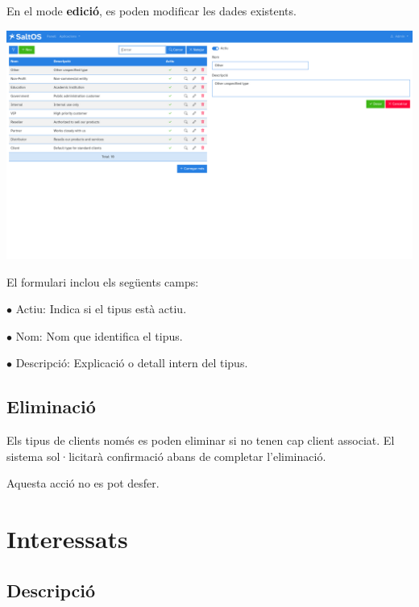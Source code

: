\documentclass[a4paper]{article}
\begin{document}
En el mode \textbf{edició}, es poden modificar les dades existents.

\begin{center}\includegraphics[width=1\textwidth]{../ujest/snaps/test-screenshots-js-screenshots-crm-customers-types-edit-10-ca-es-1-snap.png}\end{center}

El formulari inclou els següents camps:

\begin{compactitem}
\item[\color{myblue}$\bullet$] Actiu: Indica si el tipus està actiu.
\item[\color{myblue}$\bullet$] Nom: Nom que identifica el tipus.
\item[\color{myblue}$\bullet$] Descripció: Explicació o detall intern del tipus.
\end{compactitem}

\hypertarget{toc55}{}
\subsection{Eliminació}

Els tipus de clients només es poden eliminar si no tenen cap client associat.
El sistema sol·licitarà confirmació abans de completar l’eliminació.

Aquesta acció no es pot desfer.


\hypertarget{toc56}{}
\section{Interessats}

\hypertarget{toc57}{}
\subsection{Descripció}
\end{document}

